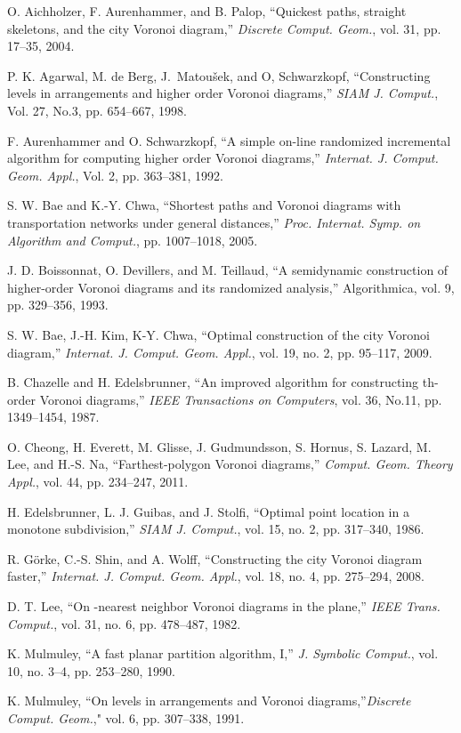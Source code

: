 \documentclass[11pt]{llncs}
\begin{document}
\begin{thebibliography}{7}

O. Aichholzer, F. Aurenhammer, and B. Palop,
``Quickest paths, straight skeletons, and the city Voronoi diagram,''
\emph{Discrete Comput. Geom.},
vol. 31, pp. 17--35, 2004.

P. K. Agarwal, M. de Berg, J.~Matou{\v s}ek, and O, Schwarzkopf, ``Constructing levels in arrangements and higher order Voronoi diagrams,'' \emph{SIAM J. Comput.}, Vol. 27, No.3, pp. 654--667, 1998.

F. Aurenhammer and O. Schwarzkopf, ``A simple on-line randomized incremental algorithm for computing higher order Voronoi diagrams,''
\emph{Internat. J. Comput. Geom. Appl.}, Vol. 2, pp. 363--381, 1992.

S. W. Bae and K.-Y. Chwa,
``Shortest paths and Voronoi diagrams with transportation networks under general distances,''
 \emph{Proc. Internat. Symp. on Algorithm and Comput.},
 pp. 1007--1018, 2005.

J. D. Boissonnat, O. Devillers, and M. Teillaud, ``A semidynamic construction of higher-order Voronoi diagrams and its randomized analysis,'' Algorithmica, vol. 9, pp. 329--356, 1993.

S. W. Bae, J.-H. Kim, K-Y. Chwa,
``Optimal construction of the city Voronoi diagram,''
\emph{Internat. J. Comput. Geom. Appl.},
vol. 19, no. 2, pp. 95--117, 2009.

B. Chazelle and H. Edelsbrunner, ``An improved algorithm for constructing th-order Voronoi diagrams,''
\emph{IEEE Transactions on Computers}, vol. 36, No.11, pp. 1349--1454, 1987.

O. Cheong, H. Everett, M. Glisse, J. Gudmundsson,
S. Hornus, S. Lazard, M. Lee, and H.-S. Na,
``Farthest-polygon Voronoi diagrams,''
\emph{Comput. Geom. Theory Appl.},
vol. 44, pp. 234--247, 2011.


H. Edelsbrunner, L. J. Guibas, and J. Stolfi,
``Optimal point location in a monotone subdivision,''
\emph{SIAM J. Comput.},
vol. 15, no. 2, pp. 317--340, 1986.

R. G\"{o}rke, C.-S. Shin, and A. Wolff,
``Constructing the city Voronoi diagram faster,''
\emph{Internat. J. Comput. Geom. Appl.},
vol. 18, no. 4, pp. 275--294, 2008.

 D. T. Lee, ``On -nearest neighbor Voronoi diagrams in the plane,''
\emph{IEEE Trans. Comput.}, vol. 31, no. 6, pp. 478--487, 1982.

K. Mulmuley,
``A fast planar partition algorithm, I,''
\emph{J. Symbolic Comput.},
vol. 10, no. 3--4, pp. 253--280, 1990.

K. Mulmuley, ``On levels in arrangements and Voronoi diagrams,''\emph{Discrete Comput. Geom.}," vol. 6, pp. 307--338, 1991.




\end{thebibliography}
\end{document}
